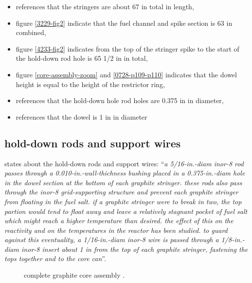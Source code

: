 \documentclass{article}
\newcommand*{\mrsarchive}{../../msr-archive}%
\begin{document}
\begin{itemize}
  \item
  \textcite[page 112 and 114]{ornl-tm-3039} references that the stringers are about 67 in total in length,
  \item
  figure \ref{3229-fig2} indicate that the fuel channel and spike section is 63 in combined,
  \item
  figure \ref{4233-fig2} indicates from the top of the stringer spike to the start of the hold-down rod hole is 65 1/2 in in total,
  \item
  figure \ref{core-assembly-zoom} and \ref{0728-p109-p110} indicates that the dowel height is equal to the height of the restrictor ring,
  \item
  \parencite[page 84-85]{ornl-tm-0728} references that the hold-down hole rod holes are 0.375 in in diameter,
  \item
  \parencite[page 79 and 81]{ornl-tm-0728} references that the dowel is 1 in in diameter
\end{itemize}

\subsection{hold-down rods and support wires}
\label{sec:hold-down-rods-support-wires}
\parencite[page 84-85]{ornl-tm-0728} states about the hold-down rods and support wires:
\enquote{\textit{a 5/16-in.-diam inor-8 rod passes through a 0.010-in.-wall-thichness bushing placed in a 0.375-in.-diam hole in the dowel section at the bottom of each graphite stringer. these rods also pass through the inor-8 grid-supporting structure and prevent each graphite stringer from floating in the fuel salt. if a graphite stringer were to break in two, the top partion would tend to float away and leave a relatively stagnant pocket of fuel salt which might reach a higher temperature than desired. the effect of this on the reactivity and on the temperatures in the reactor has been studied. to guard against this eventuality, a 1/16-in.-diam inor-8 wire is passed through a 1/8-in.-diam inor-8 insert about 1 in from the top of each graphite stringer, fastening the tops together and to the core can}}.

\begin{figure}[H]
  \centering
  \caption{complete graphite core assembly \parencite[figure 41]{ornl-3708}.}
  \label{3708-fig40}
\end{figure}
\end{document}
